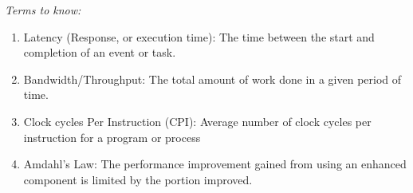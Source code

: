\documentclass{book}
\begin{document}
	\noindent\emph{Terms to know: }
	\begin{enumerate}
		\item Latency (Response, or execution time): The time between the start and completion of an event or task.
		\item Bandwidth/Throughput: The total amount of work done in a given period of time.
		\item Clock cycles Per Instruction (CPI): Average number of clock cycles per instruction for a program or process
		\item Amdahl's Law: The performance improvement gained from using an enhanced component is limited by the portion improved.
	\end{enumerate}
\end{document}

